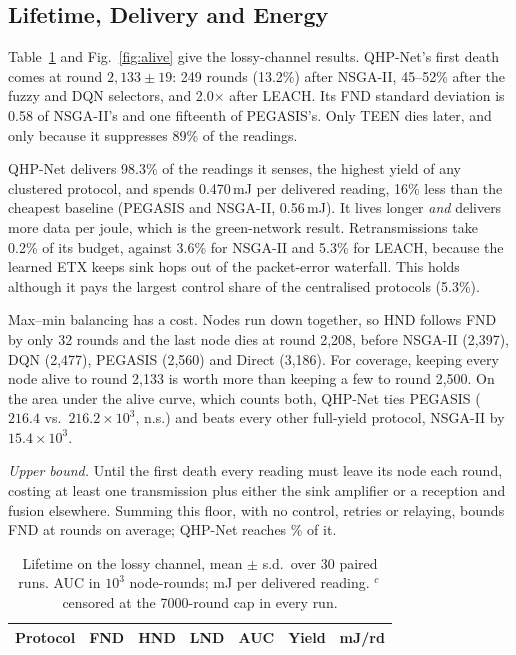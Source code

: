 \subsection{Lifetime, Delivery and Energy}
Table~\ref{tab:life} and Fig.~\ref{fig:alive} give the lossy-channel results. QHP-Net's first death comes at round $2{,}133\pm19$: 249 rounds (13.2\%) after NSGA-II, 45--52\% after the fuzzy and DQN selectors, and 2.0$\times$ after LEACH. Its FND standard deviation is 0.58 of NSGA-II's and one fifteenth of PEGASIS's. Only TEEN dies later, and only because it suppresses 89\% of the readings.

QHP-Net delivers 98.3\% of the readings it senses, the highest yield of any clustered protocol, and spends 0.470\,mJ per delivered reading, 16\% less than the cheapest baseline (PEGASIS and NSGA-II, 0.56\,mJ). It lives longer \emph{and} delivers more data per joule, which is the green-network result. Retransmissions take 0.2\% of its budget, against 3.6\% for NSGA-II and 5.3\% for LEACH, because the learned ETX keeps sink hops out of the packet-error waterfall. This holds although it pays the largest control share of the centralised protocols (5.3\%).

Max--min balancing has a cost. Nodes run down together, so HND follows FND by only 32 rounds and the last node dies at round 2,208, before NSGA-II (2,397), DQN (2,477), PEGASIS (2,560) and Direct (3,186). For coverage, keeping every node alive to round 2,133 is worth more than keeping a few to round 2,500. On the area under the alive curve, which counts both, QHP-Net ties PEGASIS ($216.4$ vs.\ $216.2\times10^3$, n.s.) and beats every other full-yield protocol, NSGA-II by $15.4\times10^3$.

\emph{Upper bound.} Until the first death every reading must leave its node each round, costing at least one transmission plus either the sink amplifier or a reception and fusion elsewhere. Summing this floor, with no control, retries or relaying, bounds FND at \fndbound{} rounds on average; QHP-Net reaches \fndfrac\% of it.

\begin{table}[t]
\caption{Lifetime on the lossy channel, mean $\pm$ s.d.\ over 30 paired runs. AUC in $10^3$ node-rounds; mJ per delivered reading. $^c$\,censored at the 7000-round cap in every run.}
\label{tab:life}
\centering\footnotesize
\setlength{\tabcolsep}{2.6pt}
\begin{tabular}{@{}lrrrrrr@{}}
\toprule
Protocol & FND & HND & LND & AUC & Yield & mJ/rd\\
\midrule

\bottomrule
\end{tabular}
\end{table}

